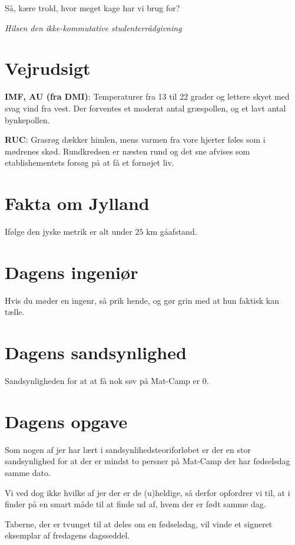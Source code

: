 \begin{minipage}[b]{0.95\linewidth}
\begin{minipage}[t]{0.47\textwidth}
Så, kære trold, hvor meget kage har vi brug for?

{\flushright\emph{Hilsen den ikke-kommutative studenterrådgivning}}

\end{minipage}%
\hfill\begin{minipage}[t]{0.47\textwidth}
\vspace{2mm}
\section*{Vejrudsigt}
\textbf{IMF, AU (fra DMI)}: Temperaturer fra 13 til 22 grader og lettere skyet med svag vind fra vest. Der forventes et moderat antal græspollen, og et lavt antal bynkepollen.

\textbf{RUC}: Grasrøg dækker himlen, mens varmen fra vore hjerter føles som i mødrenes skød. Rundkredsen er næsten rund og det sne afvises som etablishementets forsøg på at få et fornøjet liv.

\section*{Fakta om Jylland}
Ifølge den jyske metrik er alt under $25$ km gåafstand.

\section*{Dagens ingeniør}
Hvis du møder en ingenr, så prik hende, og gør grin med at hun faktisk kan tælle.

\section*{Dagens sandsynlighed}
Sandsynligheden for at at få nok søv på Mat-Camp er $0$.

\section*{Dagens opgave}
Som nogen af jer har lært i sandsynlihedsteoriforløbet er der en stor sandsynlighed for at der er mindst to persner på Mat-Camp der har fødselsdag samme dato. 

Vi ved dog ikke hvilke af jer der er de (u)heldige, så derfor opfordrer vi til, at i finder på en smart måde til at finde ud af, hvem der er født samme dag. 

Taberne, der er tvunget til at deles om en fødselsdag, vil vinde et signeret eksemplar af fredagens dagsseddel.


\end{minipage}
\end{minipage}
